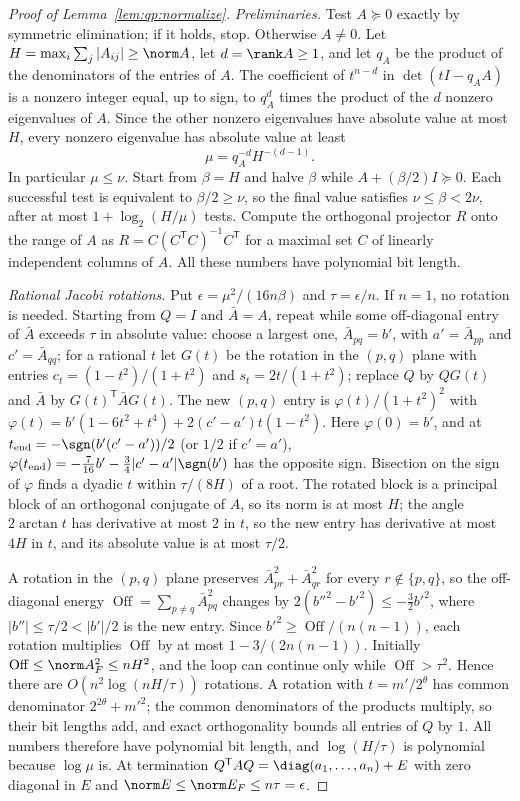 \begin{proof}[Proof of Lemma~\ref{lem:qp:normalize}]
\emph{Preliminaries.} Test $A\succeq0$ exactly by symmetric elimination; if it
holds, stop. Otherwise $A\ne0$. Let $H=\max_i\sum_j|A_{ij}|\ge\norm A$, let
$d=\rank A\ge1$, and let $q_A$ be the product of the denominators of the
entries of $A$. The coefficient of $t^{n-d}$ in $\det(tI-q_AA)$ is a nonzero
integer equal, up to sign, to $q_A^d$ times the product of the $d$ nonzero
eigenvalues of $A$. Since the other nonzero eigenvalues have absolute value at
most $H$, every nonzero eigenvalue has absolute value at least
\[
 \mu=q_A^{-d}H^{-(d-1)} .
\]
In particular $\mu\le\nu$. Start from $\beta=H$ and halve $\beta$ while
$A+(\beta/2)I\succeq0$. Each successful test is equivalent to $\beta/2\ge\nu$,
so the final value satisfies $\nu\le\beta<2\nu$, after at most
$1+\log_2(H/\mu)$ tests. Compute the orthogonal projector $R$ onto the range of
$A$ as $R=C(C^{\mathsf T} C)^{-1}C^{\mathsf T}$ for a maximal set $C$ of linearly
independent columns of $A$. All these numbers have polynomial bit length.

\emph{Rational Jacobi rotations.} Put $\epsilon=\mu^2/(16n\beta)$ and
$\tau=\epsilon/n$. If $n=1$, no rotation is needed. Starting from $Q=I$
and $\bar A=A$, repeat while some
off-diagonal entry of $\bar A$ exceeds $\tau$ in absolute value: choose a
largest one, $\bar A_{pq}=b'$, with $a'=\bar A_{pp}$ and $c'=\bar A_{qq}$; for a
rational $t$ let $G(t)$ be the rotation in the $(p,q)$ plane with entries
$c_t=(1-t^2)/(1+t^2)$ and $s_t=2t/(1+t^2)$; replace $Q$ by $QG(t)$ and $\bar A$
by $G(t)^{\mathsf T}\bar AG(t)$. The new $(p,q)$ entry is
$\varphi(t)/(1+t^2)^2$ with
$\varphi(t)=b'(1-6t^2+t^4)+2(c'-a')t(1-t^2)$. Here $\varphi(0)=b'$, and at
$t_{\rm end}=-\sgn(b'(c'-a'))/2$ (or $1/2$ if $c'=a'$),
$\varphi(t_{\rm end})=-\frac7{16}b'-\frac34|c'-a'|\sgn(b')$ has the opposite
sign. Bisection on the sign of $\varphi$ finds a dyadic $t$ within
$\tau/(8H)$ of a root. The rotated block is a principal block of an orthogonal
conjugate of $A$, so its norm is at most $H$; the angle $2\arctan t$ has
derivative at most $2$ in $t$, so the new entry has derivative at most $4H$ in
$t$, and its absolute value is at most $\tau/2$.

A rotation in the $(p,q)$ plane preserves $\bar A_{pr}^2+\bar A_{qr}^2$ for
every $r\notin\{p,q\}$, so the off-diagonal energy
$\operatorname{Off}=\sum_{p\ne q}\bar A_{pq}^2$ changes by
$2(b''^2-b'^2)\le-\frac32b'^2$, where $|b''|\le\tau/2<|b'|/2$ is the new entry.
Since $b'^2\ge\operatorname{Off}/(n(n-1))$, each rotation multiplies
$\operatorname{Off}$ by at most $1-3/(2n(n-1))$. Initially
$\operatorname{Off}\le\norm A_F^2\le nH^2$, and the loop can continue only while
$\operatorname{Off}>\tau^2$. Hence there are $O(n^2\log(nH/\tau))$ rotations.
A rotation with $t=m'/2^{\theta}$ has common denominator $2^{2\theta}+m'^2$; the
common denominators of the products multiply, so their bit lengths add, and
exact orthogonality bounds all entries of $Q$ by $1$. All numbers therefore
have polynomial bit length, and $\log(H/\tau)$ is polynomial because $\log\mu$
is. At termination $Q^{\mathsf T} AQ=\diag(a_1,\dots,a_n)+E$ with zero diagonal in
$E$ and $\norm E\le\norm E_F\le n\tau=\epsilon$.


\end{proof}
